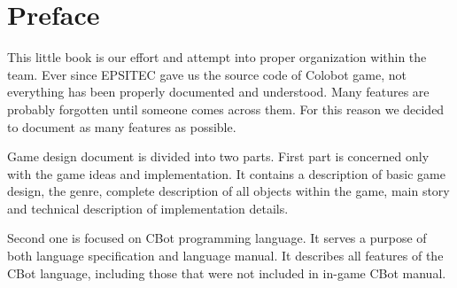 
\chapter{Preface}

This little book is our effort and attempt into proper organization within the team. Ever since EPSITEC gave us the source code of Colobot game, not everything has been properly documented and understood. Many features are probably forgotten until someone comes across them. For this reason we decided to document as many features as possible.

Game design document is divided into two parts. First part is concerned only with the game ideas and implementation. It contains a description of basic game design, the genre, complete description of all objects within the game, main story and technical description of implementation details.

Second one is focused on CBot programming language. It serves a purpose of both language specification and language manual. It describes all features of the CBot language, including those that were not included in in-game CBot manual.

